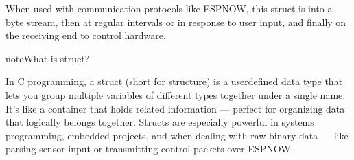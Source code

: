 \documentclass[letterpaper,10pt,english]{sphinxmanual}
\begin{document}
\begin{sphinxVerbatim}[commandchars=\\\{\}]
\end{sphinxVerbatim}

\begin{sphinxVerbatim}[commandchars=\\\{\}]
\end{sphinxVerbatim}

\sphinxAtStartPar
When used with communication protocols like ESP\sphinxhyphen{}NOW, this struct is  into a byte stream, then
 at regular intervals or in response to user input, and finally
 on the receiving end to control hardware.

\begin{sphinxadmonition}{note}{What is struct?}

\sphinxAtStartPar
In C programming, a struct (short for structure) is a user\sphinxhyphen{}defined data type that lets you group multiple variables of different types together under a
single name. It’s like a container that holds related information — perfect for organizing data that logically belongs together. Structs are especially
powerful in systems programming, embedded projects, and when dealing with raw binary data — like parsing sensor input or transmitting control packets over
ESP\sphinxhyphen{}NOW.
\end{sphinxadmonition}
\end{document}
